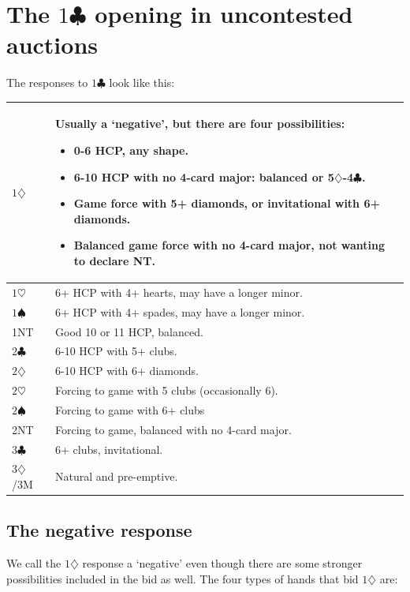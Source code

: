 \documentclass{article}
\newcommand{\sz}{\spadesuit}
\newcommand{\hz}{\heartsuit}
\newcommand{\dz}{\diamondsuit}
\newcommand{\cz}{\clubsuit}
\newcommand{\st}{\rule{0pt}{4mm}}
\begin{document}
\newpage
\section{The $1\cz$ opening in uncontested auctions}

The responses to $1\cz$ look like this:
\begin{center}
\begin{tabular}{|l|p{10cm}|} \hline
$1\dz$ & \st Usually a `negative', but there are four possibilities:
\begin{itemize}
\item 0-6 HCP, any shape.
\item 6-10 HCP with no 4-card major: balanced or 5$\dz$-4$\cz$.
\item Game force with 5+ diamonds, or invitational with 6+ diamonds.
\item Balanced game force with no 4-card major, not wanting to declare NT.
\end{itemize} \\ \hline
$1\hz$ & \st 6+ HCP with 4+ hearts, may have a longer minor. \\ \hline
$1\sz$ & \st 6+ HCP with 4+ spades, may have a longer minor. \\ \hline
1NT & \st Good 10 or 11 HCP, balanced. \\ \hline
$2\cz$ & \st 6-10 HCP with 5+ clubs. \\ \hline
$2\dz$ & \st 6-10 HCP with 6+ diamonds. \\ \hline
$2\hz$ & \st Forcing to game with 5 clubs (occasionally 6). \\ \hline
$2\sz$ & \st Forcing to game with 6+ clubs \\ \hline
2NT & \st Forcing to game, balanced with no 4-card major. \\ \hline
$3\cz$ & \st 6+ clubs, invitational. \\ \hline
$3\dz$/3M & \st Natural and pre-emptive. \\ \hline
\end{tabular}
\end{center}

\subsection{The negative response}

We call the $1\dz$ response a `negative' even though there are some stronger possibilities included in the bid as well. The four types of hands that bid $1\dz$ are:
\end{document}
